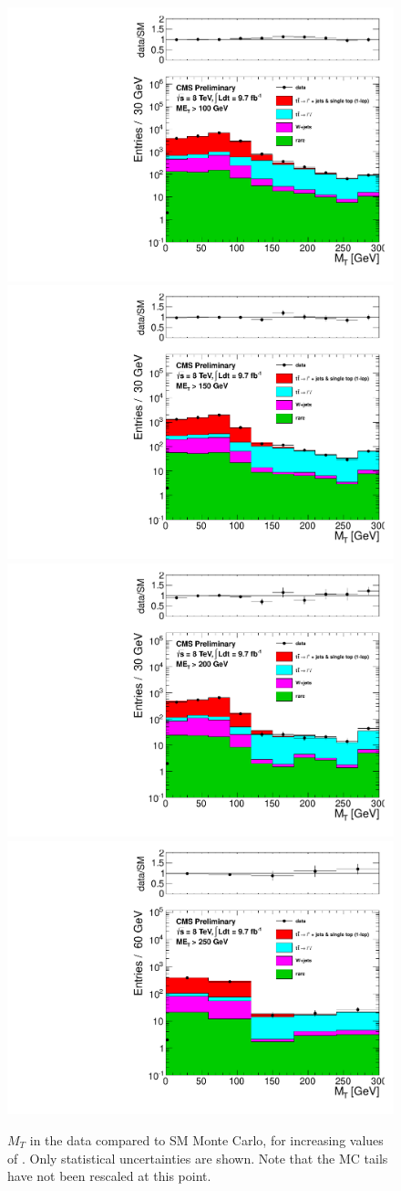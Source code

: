 \begin{figure}[hbt]
  \begin{center}
        \includegraphics[width=0.5\linewidth]{plots/mt_met100_emucomb.pdf}%
        \includegraphics[width=0.5\linewidth]{plots/mt_met150_emucomb.pdf}
        \includegraphics[width=0.5\linewidth]{plots/mt_met200_emucomb.pdf}%
        \includegraphics[width=0.5\linewidth]{plots/mt_met250_emucomb.pdf}
    \caption{$M_T$ in the data compared to SM Monte Carlo, for
      increasing values of \met. Only statistical uncertainties are
      shown. Note that the MC tails have not
      been rescaled at this point.
\label{fig:mtsig1}
}  
      \end{center}
\end{figure}

